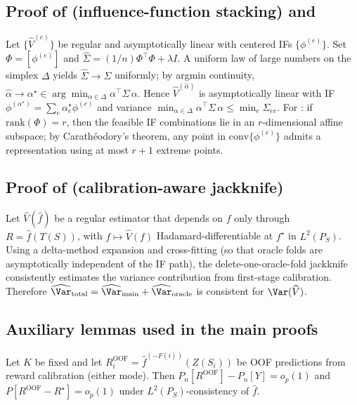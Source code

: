 \subsection{Proof of \texorpdfstring{}{Theorem 5} (influence-function stacking) and \texorpdfstring{}{Carath\'eodory sparsity}}
\label{app:proof-stack}
Let $\{\widehat V^{(e)}\}$ be regular and asymptotically linear with centered IFs $\{\phi^{(e)}\}$. Set $\Phi=[\phi^{(e)}]$ and $\hat\Sigma=(1/n)\Phi^\top\Phi+\lambda I$. A uniform law of large numbers on the simplex $\Delta$ yields $\hat\Sigma\to\Sigma$ uniformly; by argmin continuity, $\hat\alpha\to\alpha^\star\in\arg\min_{\alpha\in\Delta}\alpha^\top\Sigma\,\alpha$. Hence $\widehat V^{(\hat\alpha)}$ is asymptotically linear with IF $\phi^{(\alpha^\star)}=\sum_e \alpha^\star_e \phi^{(e)}$ and variance $\min_{\alpha\in\Delta}\alpha^\top\Sigma\,\alpha \le \min_e \Sigma_{ee}$. For : if $\mathrm{rank}(\Phi)=r$, then the feasible IF combinations lie in an $r$-dimensional affine subspace; by Carath\'eodory's theorem, any point in $\mathrm{conv}\{\phi^{(e)}\}$ admits a representation using at most $r{+}1$ extreme points.

\subsection{Proof of \texorpdfstring{}{Proposition 2} (calibration-aware jackknife)}
\label{app:proof-oua}
Let $\widehat V(\hat f)$ be a regular estimator that depends on $f$ only through $R=\hat f(T(S))$, with $f\mapsto \widehat V(f)$ Hadamard-differentiable at $f^\star$ in $L^2(P_S)$. Using a delta-method expansion and cross-fitting (so that oracle folds are asymptotically independent of the IF path), the delete-one-oracle-fold jackknife \citep{Bickel1993,Kunsch1989BlockBootstrap,PolitisRomano1994StationaryBootstrap} consistently estimates the variance contribution from first-stage calibration. Therefore $\widehat{\Var}_{\mathrm{total}}=\widehat{\Var}_{\mathrm{main}}+\widehat{\Var}_{\mathrm{oracle}}$ is consistent for $\Var(\widehat V)$.

\subsection{Auxiliary lemmas used in the main proofs}
\label{app:aux}

\begin{lemma}
\label{lem:oof-mean}
Let $K$ be fixed and let $R^{\mathrm{OOF}}_i=\hat f^{(-F(i))}(Z(S_i))$ be OOF predictions from reward calibration (either mode). Then $P_n[R^{\mathrm{OOF}}]-P_n[Y]=o_p(1)$ and $P[R^{\mathrm{OOF}}-R^\star]=o_p(1)$ under $L^2(P_S)$-consistency of $\hat f$.
\end{lemma}

